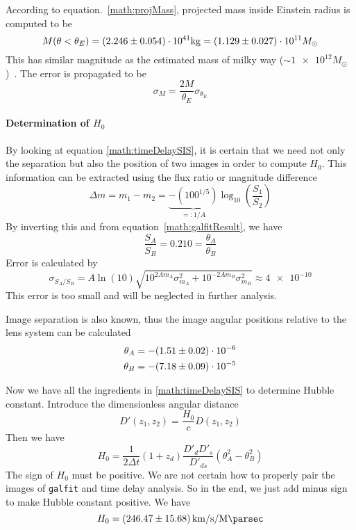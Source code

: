 According to equation.~\ref{math:projMass}, projected mass inside Einstein radius is computed to be
\begin{equation}
	M(\theta < \theta_E) = (\num{2.246 +- 0.054}) \cdot 10^{41} \si{\kg} = (\num{1.129 +- 0.027}) \cdot 10^{11} M_\odot
\end{equation}
This has similar magnitude as the estimated mass of milky way ($\sim \num{1e12} M_\odot$)~\cite{Grand_2019}. The error is propagated to be
\begin{equation*}
	\sigma_{M} = \frac{2M}{\theta_E} \sigma_{\theta_E}
\end{equation*}

\paragraph{Determination of $H_0$}
By looking at equation \eqref{math:timeDelaySIS}, it is certain that we need not only the separation but also the position of two images in order to compute $H_0$. This information can be extracted using the flux ratio or magnitude difference
\begin{equation}
	\Delta m = m_1 - m_2 = \underbrace{ - (100^{1/5})}_{=: 1/A} \log_{10} \left( \frac{S_1}{S_2} \right)
\end{equation}
By inverting this and from equation~\eqref{math:galfitResult}, we have
\begin{equation}
	\frac{S_A}{S_B} = \num{0.210}  = \frac{\theta_A}{\theta_B}
\end{equation}
Error is calculated by
\begin{equation*}
	\sigma_{S_A/S_B} = A \ln(10) \sqrt{ 10^{2Am_A} \sigma_{m_A}^2 + 10^{-2Am_B}\sigma_{m_B}^2} \approx \num{4e-10}
\end{equation*}
This error is too small and will be neglected in further analysis.

Image separation is also known, thus the image angular positions relative to the lens system can be calculated
\begin{align}
	\begin{split}	
	\theta_A &= -(\num{1.51 +- 0.02 })\cdot 10^{-6}\\
	\theta_B &= -(\num{7.18 +- 0.09})\cdot 10^{-5}
	\end{split}
\end{align}

Now we have all the ingredients in \eqref{math:timeDelaySIS} to determine Hubble constant. Introduce the dimensionless angular distance
\begin{equation*}
	D'(z_1, z_2 ) = \frac{H_0}{c} D(z_1, z_2)
\end{equation*}
Then we have
\begin{equation}
	H_0 =  \frac{1}{2 \Delta t} (1+z_d) \frac{D'_d D'_s}{D'_{ds}} (\theta_A^2 - \theta_B^2)
\end{equation}
The sign of $H_0$ must be positive. We are not certain how to properly pair the images of \verb|galfit| and time delay analysis. So in the end, we just add minus sign to make Hubble constant positive. We have
\begin{equation}
	H_0 = \SI{246.47 +- 15.68}{\km\per\s\per\mega\parsec}
\end{equation}


